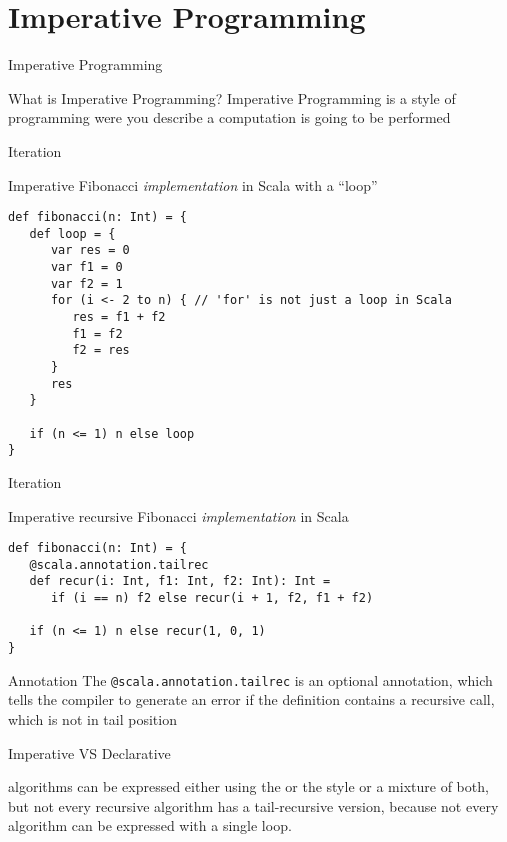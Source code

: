 \section{Imperative Programming}
\begin{frame}{Imperative Programming}
\begin{block}{What is Imperative Programming?}
\pause
Imperative Programming is a style of programming were you describe
 a computation is going to be performed
\end{block}
\end{frame}

\begin{frame}[fragile]{Iteration}
\begin{exampleblock}{Imperative Fibonacci \emph{implementation} in
Scala with a ``loop''}
\begin{lstlisting}
def fibonacci(n: Int) = {
   def loop = {
      var res = 0
      var f1 = 0
      var f2 = 1
      for (i <- 2 to n) { // 'for' is not just a loop in Scala
         res = f1 + f2
         f1 = f2
         f2 = res
      }
      res
   }

   if (n <= 1) n else loop
}
\end{lstlisting}
\end{exampleblock}
\end{frame}

\begin{frame}[fragile]{Iteration}
\begin{exampleblock}{Imperative recursive Fibonacci \emph{implementation} in
Scala}
\begin{lstlisting}
def fibonacci(n: Int) = {
   @scala.annotation.tailrec
   def recur(i: Int, f1: Int, f2: Int): Int =
      if (i == n) f2 else recur(i + 1, f2, f1 + f2)

   if (n <= 1) n else recur(1, 0, 1)
}
\end{lstlisting}
\end{exampleblock}
\pause
\begin{block}{Annotation}
The \lstinline!@scala.annotation.tailrec! is an optional annotation, which tells
the compiler to generate an \alert{error} if the definition contains a recursive call, which is
not in tail position
\end{block}
\end{frame}

\begin{frame}{Imperative VS Declarative}
\begin{center}
 algorithms can be expressed either using the
 or the  style or a mixture of
both, but not every recursive algorithm has a tail-recursive version, because
not every algorithm can be expressed with a single loop.
\end{center}
\end{frame}

